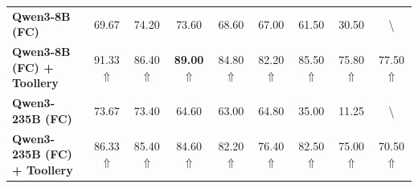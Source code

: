 \begin{table}[htb]
{\begin{tabular}{lcccccccc}
\textbf{Qwen3-8B (FC)}                      & 69.67 & 74.20 & 73.60 & 68.60 & 67.00 & 61.50 & 30.50 & \textbackslash{} \\
\textbf{Qwen3-8B (FC) + Toollery}           & 91.33 $\Uparrow$ & 86.40 $\Uparrow$ & \textbf{89.00} $\Uparrow$ & 84.80 $\Uparrow$ & 82.20 $\Uparrow$ & 85.50 $\Uparrow$ & 75.80 $\Uparrow$ & 77.50 $\Uparrow$            \\ \hline
\textbf{Qwen3-235B (FC)}                    & 73.67 & 73.40 & 64.60 & 63.00 & 64.80 & 35.00 & 11.25 & \textbackslash{} \\
\textbf{Qwen3-235B (FC) + Toollery}         & 86.33 $\Uparrow$ & 85.40 $\Uparrow$ & 84.60 $\Uparrow$ & 82.20 $\Uparrow$ & 76.40 $\Uparrow$ & 82.50 $\Uparrow$ & 75.00 $\Uparrow$ & 70.50 $\Uparrow$            \\\hline \hline
\end{tabular}
}
\vskip -0.1in
\end{table}
